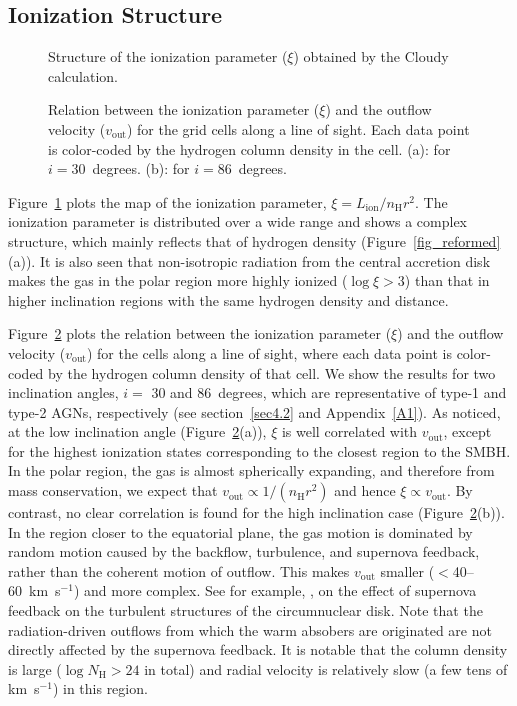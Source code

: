 \documentclass[twocolumn,times,twocolappendix]{aastex63}
\begin{document}
\subsection{Ionization Structure}



\begin{figure}
\caption{
  Structure of the ionization parameter ($\xi$) obtained
  by the \textsf{Cloudy} calculation.
}
\label{fig-ip}
\end{figure}

\begin{figure}
\caption{
Relation between the ionization parameter ($\xi$) and the
outflow velocity ($v_\mathrm{out}$) for the grid cells along a line of sight. 
Each data point is color-coded by the hydrogen column density in the cell.
(a): for $i = 30$~degrees. 
(b): for $i = 86$~degrees.
}
\label{fig-vxi}
\end{figure}

Figure~\ref{fig-ip} plots the map of the ionization parameter, $\xi =
L_\mathrm{ion}/n_\mathrm{H} r^2$.
The ionization parameter is distributed over a wide range
and shows a complex structure, which 
mainly reflects that of hydrogen density
(Figure~\ref{fig_reformed}(a)).
It is also seen that non-isotropic radiation from the central
accretion disk makes the gas in the polar region more highly ionized ($\log \xi > 3$)
than that in higher inclination regions with the same hydrogen density
and distance.

Figure~\ref{fig-vxi} plots the relation between
the ionization
parameter ($\xi$) and the outflow velocity ($v_\mathrm{out}$) for the
cells along a line of sight, where each data point is color-coded
by the hydrogen column density of that cell.
We show the results for two inclination angles, $i=$ 30 and 86~degrees,
which are representative of type-1 and type-2 AGNs, respectively
(see section~\ref{sec4.2} and Appendix~\ref{A1}).
As noticed, 
at the low inclination angle (Figure~\ref{fig-vxi}(a)), 
$\xi$ is well correlated with $v_\mathrm{out}$, except for the highest
ionization states corresponding to the closest region to the SMBH.
In the polar region, the gas is almost spherically expanding,
and therefore from mass conservation, we expect that
$v_\mathrm{out} \propto 1/(n_\mathrm{H} r^2)$ 
and hence $\xi \propto v_\mathrm{out}$. 
By contrast, no clear correlation is found for the high inclination case
(Figure~\ref{fig-vxi}(b)).
In the region closer to the equatorial plane, the gas motion is dominated by random motion caused by the backflow, turbulence, and supernova feedback, rather than the coherent motion of outflow. This makes $v_\mathrm{out}$ smaller ($<$40--60~km~s$^{-1}$) and more complex.
See for example, \citet{Wada2002,Kawakatu2008},  
on the effect of supernova feedback on the turbulent structures of the circumnuclear disk. 
Note that the radiation-driven outflows from which the warm absobers are originated are not directly affected by the supernova feedback.
It is notable that the column density is large ($\log N_\mathrm{H} > 24$ in total) and radial velocity is relatively slow (a few tens of km~s$^{-1}$) in this region.
\end{document}
